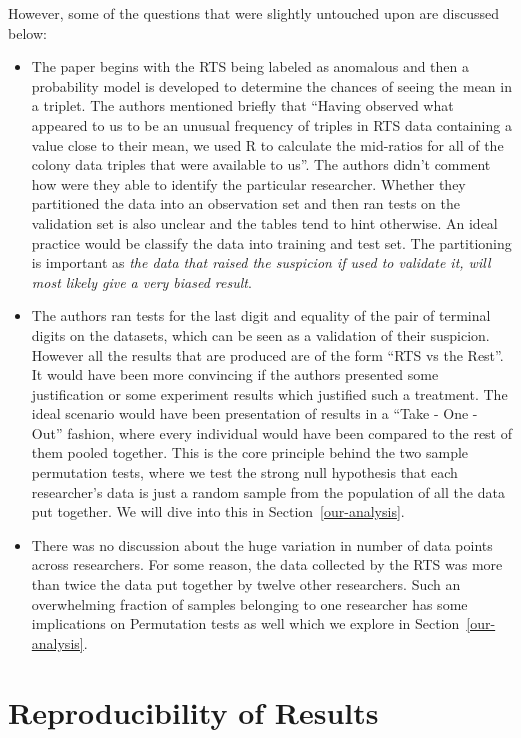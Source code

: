 \documentclass{article}
\begin{document}
However, some of the questions that were slightly untouched upon are discussed below:

\begin{itemize}
\item
  The paper begins with the RTS being labeled as anomalous and then a
  probability model is developed to determine the chances of seeing the
  mean in a triplet. The authors mentioned briefly that ``Having
  observed what appeared to us to be an unusual frequency of triples in
  RTS data containing a value close to their mean, we used R to
  calculate the mid-ratios for all of the colony data triples that were
  available to us''. The authors didn't comment how were they able to
  identify the particular researcher. Whether they partitioned the data
  into an observation set and then ran tests on the validation set is
  also unclear and the tables tend to hint otherwise. An ideal practice would be classify the data into training and test set.
  The partitioning is important as \textit{the data that raised the suspicion if used to
  validate it, will most likely give a very biased result}.
\item
  The authors ran tests for the last digit and equality of the pair
  of terminal digits on the datasets, which can be seen as a validation
  of their suspicion. However all the results that are produced are of
  the form ``RTS vs the Rest''. It would have been more convincing if
  the authors presented some justification or some experiment results
  which justified such a treatment. The ideal scenario would have been
  presentation of results in a ``Take - One - Out'' fashion, where every
  individual would have been compared to the rest of them pooled
  together. This is the core principle behind the two sample permutation
  tests, where we test the strong null hypothesis that each researcher's
  data is just a random sample from the population of all the data put
  together. We will dive into this in Section~\ref{our-analysis}.
\item
  There was no discussion about the huge variation in number of data points across
  researchers. For some reason, the data collected by the RTS was more
  than twice the data put together by twelve other researchers. Such an
  overwhelming fraction of samples belonging to one researcher has some
  implications on Permutation tests as well which we explore in Section~\ref{our-analysis}.
\end{itemize}

    \section{Reproducibility of Results}\label{reproducibility-of-results}
\end{document}
